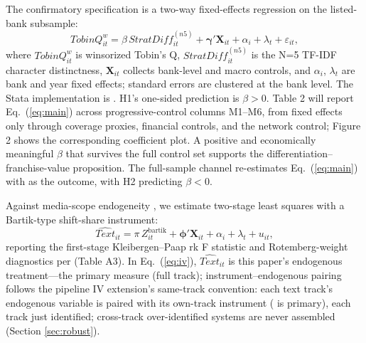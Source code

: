 The confirmatory specification is a two-way fixed-effects regression
on the listed-bank subsample:
\begin{equation}\label{eq:main}
\mathit{TobinQ}^{w}_{it}
  = \beta\,\mathit{StratDiff}^{(n5)}_{it}
  + \boldsymbol{\gamma}'\mathbf{X}_{it}
  + \alpha_i + \lambda_t + \varepsilon_{it},
\end{equation}
where $\mathit{TobinQ}^{w}_{it}$ is winsorized Tobin's Q,
$\mathit{StratDiff}^{(n5)}_{it}$ is the N=5 TF-IDF character
distinctness, $\mathbf{X}_{it}$ collects bank-level and macro
controls, and $\alpha_i$, $\lambda_t$ are bank and year fixed
effects; standard errors are clustered at the bank level. The Stata
implementation is . H1's
one-sided prediction is $\beta>0$. Table 2 will report
Eq.~(\ref{eq:main}) across progressive-control columns M1--M6, from
fixed effects only through coverage proxies, financial controls, and
the network control; Figure 2 shows the corresponding coefficient
plot. A positive and economically meaningful $\beta$ that survives
the full control set supports the differentiation--franchise-value
proposition. The full-sample channel re-estimates
Eq.~(\ref{eq:main}) with  as the outcome, with
H2 predicting $\beta<0$.

Against media-scope endogeneity \parencite{gurun2012hype}, we
estimate two-stage least squares with a Bartik-type shift-share
instrument:
\begin{equation}\label{eq:iv}
\widehat{\mathit{Text}}_{it}
  = \pi\,Z^{\mathrm{bartik}}_{it}
  + \boldsymbol{\phi}'\mathbf{X}_{it} + \alpha_i + \lambda_t + u_{it},
\end{equation}
reporting the first-stage Kleibergen--Paap rk F statistic and
Rotemberg-weight diagnostics per \textcite{goldsmith2020bartik}
(Table A3). In Eq.~(\ref{eq:iv}), $\widehat{\mathit{Text}}_{it}$ is
this paper's endogenous treatment---the primary measure
 (full track); instrument--endogenous pairing
follows the pipeline IV extension's same-track convention: each text
track's endogenous variable is paired with its own-track instrument
( is primary), each track just
identified; cross-track over-identified systems are never assembled
(Section \ref{sec:robust}).

